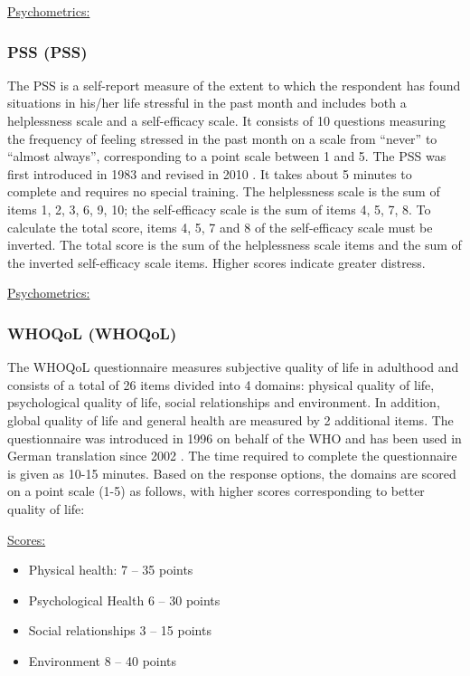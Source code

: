 \underline{Psychometrics:}

\subsubsection{\acl{PSS} (\acs{PSS})}
\label{questionnaires:PSS}
The \ac{PSS} is a self-report measure of the extent to which the respondent has found situations in his/her life stressful in the past month and includes both a helplessness scale and a self-efficacy scale. It consists of 10 questions measuring the frequency of feeling stressed in the past month on a scale from ``never'' to ``almost always'', corresponding to a point scale between 1 and 5. The \ac{PSS} was first introduced in 1983 \cite{cohen1983pss} and revised in 2010 \cite{schneider2020pss}. It takes about 5 minutes to complete and requires no special training. The helplessness scale is the sum of items 1, 2, 3, 6, 9, 10; the self-efficacy scale is the sum of items 4, 5, 7, 8. To calculate the total score, items 4, 5, 7 and 8 of the self-efficacy scale must be inverted. The total score is the sum of the helplessness scale items and the sum of the inverted self-efficacy scale items. Higher scores indicate greater distress.

\underline{Psychometrics:}

\subsubsection{\acl{WHOQoL} (\acs{WHOQoL})}
\label{questionnaires:WHOQoL}

The \ac{WHOQoL} questionnaire measures subjective quality of life in adulthood and consists of a total of 26 items divided into 4 domains: physical quality of life, psychological quality of life, social relationships and environment. In addition, global quality of life and general health are measured by 2 additional items. The questionnaire was introduced in 1996 \cite{world1996whoqol} on behalf of the \ac{WHO} and has been used in German translation since 2002 \cite{gunzelmann2002whoqol}. The time required to complete the questionnaire is given as 10-15 minutes. Based on the response options, the domains are scored on a point scale (1-5) as follows, with higher scores corresponding to better quality of life:

\underline{Scores:}
\begin{itemize}\itemsep2pt
\item Physical health: 7 -- 35 points
\item Psychological Health 6 -- 30 points
\item Social relationships 3 -- 15 points %
\item Environment 8 – 40 points
\end{itemize}

